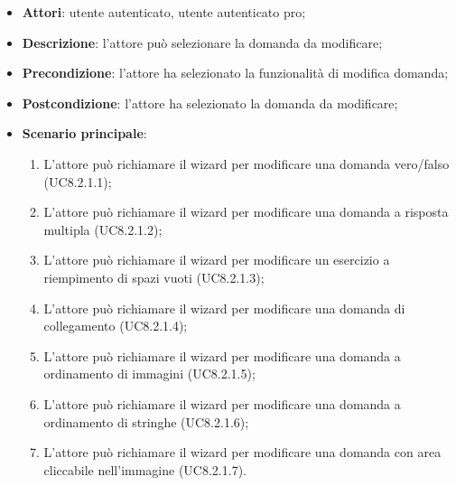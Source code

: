 		\begin{itemize}
			\item \textbf{Attori}: utente autenticato, utente autenticato pro;
			\item \textbf{Descrizione}: l'attore può selezionare la domanda da modificare;
			\item \textbf{Precondizione}: l'attore ha selezionato la funzionalità di modifica domanda;
			\item \textbf{Postcondizione}: l'attore ha selezionato la domanda da modificare; 
			\item \textbf{Scenario principale}: 
					\begin{enumerate}
					\item
					L'attore può richiamare il wizard per modificare una domanda vero/falso (UC8.2.1.1);
					\item
					L'attore può richiamare il wizard per modificare una domanda a risposta multipla (UC8.2.1.2);
					\item
					L'attore può richiamare il wizard per modificare un esercizio a riempimento di spazi vuoti (UC8.2.1.3);
					\item
					L'attore può richiamare il wizard per modificare una domanda di collegamento (UC8.2.1.4);
					\item
					L'attore può richiamare il wizard per modificare una domanda a ordinamento di immagini (UC8.2.1.5);
					\item
					L'attore può richiamare il wizard per modificare una domanda a ordinamento di stringhe (UC8.2.1.6);
					\item
					L'attore può richiamare il wizard per modificare una domanda con area cliccabile nell'immagine (UC8.2.1.7).
	 			\end{enumerate}
			
		\end{itemize}










